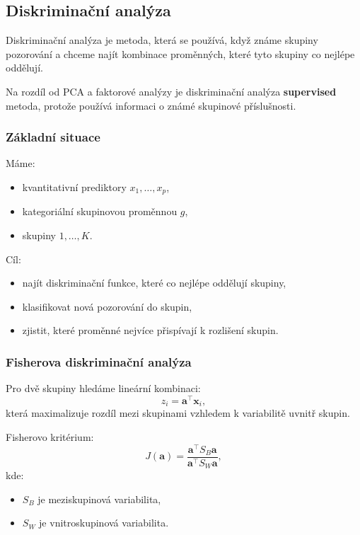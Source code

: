 \subsection{Diskriminační analýza}

Diskriminační analýza je metoda, která se používá, když známe skupiny pozorování a chceme najít kombinace
proměnných, které tyto skupiny co nejlépe oddělují.

Na rozdíl od PCA a faktorové analýzy je diskriminační analýza \textbf{supervised} metoda, protože používá
informaci o známé skupinové příslušnosti.

\subsubsection{Základní situace}

Máme:
\begin{itemize}
    \item kvantitativní prediktory $x_1,\ldots,x_p$,
    \item kategoriální skupinovou proměnnou $g$,
    \item skupiny $1,\ldots,K$.
\end{itemize}

Cíl:
\begin{itemize}
    \item najít diskriminační funkce, které co nejlépe oddělují skupiny,
    \item klasifikovat nová pozorování do skupin,
    \item zjistit, které proměnné nejvíce přispívají k rozlišení skupin.
\end{itemize}

\subsubsection{Fisherova diskriminační analýza}

Pro dvě skupiny hledáme lineární kombinaci:
\[
z_i = \mathbf{a}^\top \mathbf{x}_i,
\]
která maximalizuje rozdíl mezi skupinami vzhledem k variabilitě uvnitř skupin.

Fisherovo kritérium:
\[
J(\mathbf{a})
=
\frac{\mathbf{a}^\top S_B\mathbf{a}}
{\mathbf{a}^\top S_W\mathbf{a}},
\]
kde:
\begin{itemize}
    \item $S_B$ je meziskupinová variabilita,
    \item $S_W$ je vnitroskupinová variabilita.
\end{itemize}

